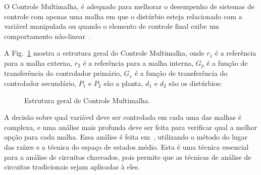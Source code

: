 
    O Controle Multimalha, é adequado para melhorar o desempenho
    de sistemas de controle com apenas uma malha em que o distúrbio esteja
    relacionado com a variável manipulada ou quando o elemento de controle final
    exibe um comportamento não-linear~\cite{ref:LEE}.

    A Fig.~\ref{fig:multiloop} mostra a estrutura geral do Controle Multimalha, onde
    $r_1$ é a referência para a malha externa, $r_2$ é a referência para a malha
    interna, $G_p$ é a função de transferência do controlador primário,
    $G_s$ é a função de transferência do controlador secundário, $P_1$ e $P_2$
    são a planta, $d_1$ e $d_2$ são os distúrbios:


    \begin{figure}[htb]
        \renewcommand\figurename{Fig.}
        \caption{Estrutura geral de Controle Multimalha.}
        \label{fig:multiloop}
    \end{figure}

    A decisão sobre qual variável deve ser controlada em cada uma das malhas é complexa,
    e uma análise mais profunda deve ser feita para verificar qual a melhor
    opção para cada malha. Essa análise é feita em~\cite{ref:NASER}, utilizando o
    método do lugar das raízes e a técnica do espaço de estados médio. Esta é uma técnica
    essencial para a análise de circuitos chaveados, pois permite que as técnicas de
    análise de circuitos tradicionais sejam aplicadas à eles.

